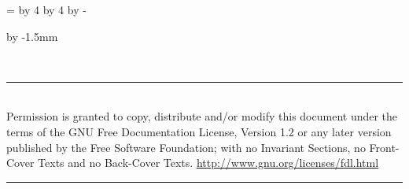 \documentclass[8pt,pagesize,twoside,footexclude,headexclude]{scrartcl}
\begin{document}
\clearpage
\pagestyle{empty}
\newcount\currentpage 
\currentpage=\value{page} 
\divide\currentpage by 4  
\multiply\currentpage by 4  
\advance\currentpage by -\value{page}
%
\ifnum\the{} 
\rule{0pt}{0pt}\clearpage
\else\ifnum\the{}
\rule{0pt}{0pt}\clearpage\rule{0pt}{0pt}\clearpage 
\else\ifnum\the{}
\rule{0pt}{0pt}\clearpage\rule{0pt}{0pt}\clearpage\rule{0pt}{0pt}\clearpage 
\fi\fi\fi
%
\begin{titlepage}
  \advance\evensidemargin by -1.5mm
  \begin{center}
    \renewcommand{\rmdefault}{ptm} %
    \vspace*{20pt}
    \vfill
    \begin{minipage}{\titlepagewidth}
      \begin{center}
        \rmfamily\mdseries\itshape\fontsize{300}{0}\selectfont
        \\
      \end{center}
    \end{minipage}
    \vfill
    \vspace*{40.5mm}%
    \begin{minipage}{\titlepagewidth}
      \hrule
      \vspace{1.5mm}
      \rmfamily\small
      \\[1mm] 
      Permission is granted to copy, distribute and/or modify this
      document under the terms of the GNU Free Documentation License,
      Version 1.2 or any later version published by the Free Software
      Foundation; with no Invariant Sections, no Front-Cover Texts and
      no Back-Cover Texts.\hfill
      \href{http://www.gnu.org/licenses/fdl.html}{http://www.gnu.org/licenses/fdl.html}\\
      \vspace{-1mm}
      \hrule
    \end{minipage}
  \end{center}
\end{titlepage}
\end{document}
